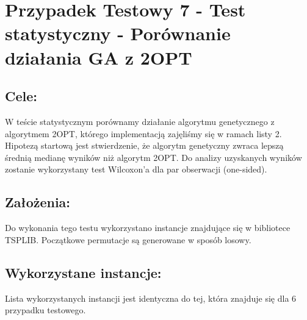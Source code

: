 \section{Przypadek Testowy 7 - Test statystyczny - Porównanie działania GA z 2OPT}
  \subsection{Cele:}
  W teście statystycznym porównamy działanie algorytmu genetycznego z algorytmem 2OPT,
  którego implementacją zajęliśmy się w ramach listy 2. Hipotezą startową jest stwierdzenie, że
  algorytm genetyczny zwraca lepszą średnią medianę wyników niż algorytm 2OPT. Do analizy
  uzyskanych wyników zostanie wykorzystany test Wilcoxon'a dla par obserwacji (one-sided).
  \subsection{Założenia: }
  Do wykonania tego testu wykorzystano instancje znajdujące się w bibliotece TSPLIB. Początkowe permutacje są generowane w sposób
  losowy.
  \subsection{Wykorzystane instancje: }
  Lista wykorzystanych instancji jest identyczna do tej, która znajduje się dla 6 przypadku testowego.
